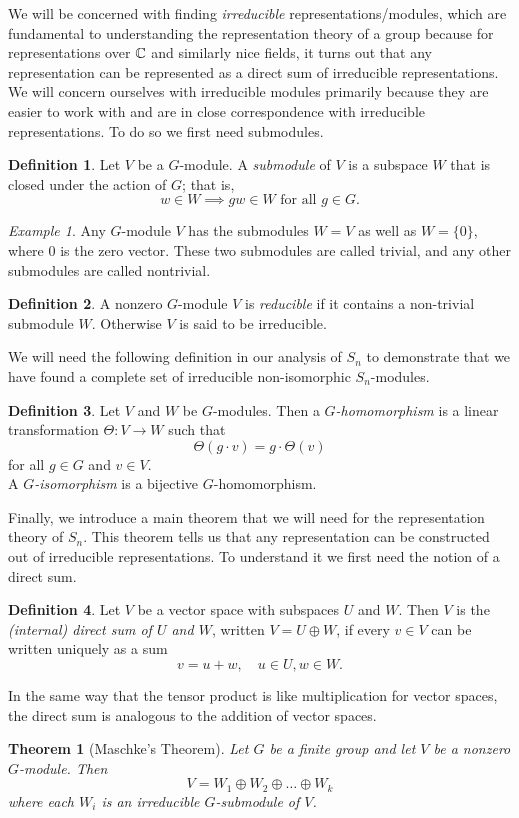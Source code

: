 \documentclass[12pt,twoside]{reedthesis}
\theoremstyle{plain}   %
\newtheorem{thm}{Theorem}[section] %
\theoremstyle{definition}
\newtheorem{defn}{Definition}[section]
\theoremstyle{remark}
\newtheorem{ex}{Example}[section]
\numberwithin{equation}{section}
\begin{document}
  We will be concerned with finding \emph{irreducible} representations/modules,
  which are fundamental to understanding the representation theory of a group because
  for representations over $\mathbb{C}$ and similarly nice fields, it turns out that any representation can be represented as a direct sum of irreducible representations.
  We will concern ourselves with irreducible modules primarily because they are easier to work with and are in close correspondence
  with irreducible representations. To do so we first need submodules.
  \begin{defn}
    Let $V$ be a $G$-module. A \emph{submodule}
    of $V$ is a subspace $W$ that is closed under the action of $G$; that is,
    \[w \in W \implies gw \in W \text{ for all } g \in G.\]
  \end{defn}
  \begin{ex}
    Any $G$-module $V$ has the submodules $W=V$ as well as $W= \{0\}$, where $0$ is the zero vector.
    These two submodules are called trivial, and any other submodules are called nontrivial.
  \end{ex}
  \begin{defn}
    A nonzero $G$-module $V$ is \emph{reducible} if it contains a non-trivial submodule $W$.
    Otherwise $V$ is said to be irreducible.
  \end{defn}

  We will need the following definition in our analysis of $S_n$ to demonstrate that we have found a complete set of irreducible non-isomorphic $S_n$-modules.

  \begin{defn}
    Let $V$ and $W$ be $G$-modules. Then a \emph{$G$-homomorphism} is a linear transformation $\Theta: V \to W$ such that
    \[\Theta(g \cdot v) = g \cdot \Theta(v)\]
    for all $g \in G$ and $v \in V$.\\
    A \emph{$G$-isomorphism} is a bijective $G$-homomorphism.
  \end{defn}

  Finally, we introduce a main theorem that we will need for the representation theory of $S_n$.
  This theorem tells us that any representation can be constructed out of irreducible representations.
  To understand it we first need the notion of a direct sum.
  \begin{defn}
    Let $V$ be a vector space with subspaces $U$ and $W$.
    Then $V$ is the \emph{(internal) direct sum of $U$ and $W$}, written $V = U \oplus W$, if every $v \in V$ can be
    written uniquely as a sum
    \[v= u +w, \quad u \in U, w \in W.\]
  \end{defn}
  In the same way that the tensor product is like multiplication for vector spaces, the direct sum is analogous to the addition of vector spaces.
  \begin{thm}[{Maschke's Theorem}]
    Let $G$ be a finite group and let $V$ be a nonzero $G$-module. Then
    \[ V = W_1 \oplus W_2 \oplus \dots \oplus W_k\]
    where each $W_i$ is an irreducible $G$-submodule of $V$.
  \end{thm}
\end{document}

